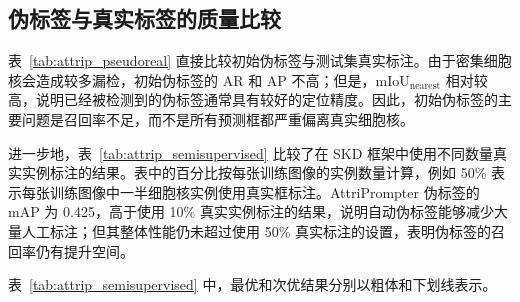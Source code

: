 \subsection{伪标签与真实标签的质量比较}

表~\ref{tab:attrip_pseudoreal} 直接比较初始伪标签与测试集真实标注。由于密集细胞核会造成较多漏检，初始伪标签的 AR 和 AP 不高；但是，$\mathrm{mIoU}_{\mathrm{nearest}}$ 相对较高，说明已经被检测到的伪标签通常具有较好的定位精度。因此，初始伪标签的主要问题是召回率不足，而不是所有预测框都严重偏离真实细胞核。

\begin{table}[t]
\caption{伪标签质量对比}
\label{tab:attrip_pseudoreal}
\begin{center}
\end{center}
\vskip -0.1in
\end{table}

进一步地，表~\ref{tab:attrip_semisupervised} 比较了在 SKD 框架中使用不同数量真实实例标注的结果。表中的百分比按每张训练图像的实例数量计算，例如 50\% 表示每张训练图像中一半细胞核实例使用真实框标注。AttriPrompter 伪标签的 mAP 为 0.425，高于使用 10\% 真实实例标注的结果，说明自动伪标签能够减少大量人工标注；但其整体性能仍未超过使用 50\% 真实标注的设置，表明伪标签的召回率仍有提升空间。

\begin{table}[t]
\caption{伪标签与真实标注监督对比}
\label{tab:attrip_semisupervised}
\begin{center}
\end{center}
\vskip -0.15in
\end{table}
表~\ref{tab:attrip_semisupervised} 中，最优和次优结果分别以粗体和下划线表示。


